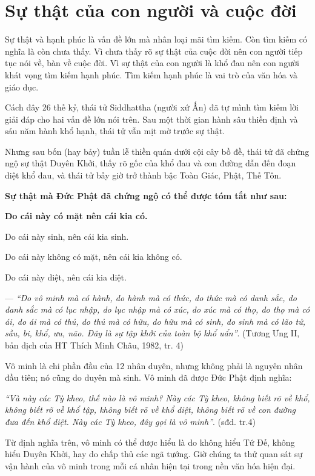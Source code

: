 \chapter{Sự thật của con người và cuộc đời} %
\label{cha:su_that_cua_con_nguoi_va_cuoc_doi}

Sự thật và hạnh phúc là vấn đề lớn mà nhân loại mãi tìm kiếm. Còn tìm kiếm có nghĩa là còn chưa thấy. Vì chưa thấy rõ sự thật của cuộc đời nên con người tiếp tục nói về, bàn về cuộc đời. Vì sự thật của con người là khổ đau nên con người khát vọng tìm kiếm hạnh phúc. Tìm kiếm hạnh phúc là vai trò của văn hóa và giáo dục.

Cách đây 26 thế kỷ, thái tử Siddhattha (người xứ Ấn) đã tự mình tìm kiếm lời giải đáp cho hai vấn đề lớn nói trên. Sau một thời gian hành sâu thiền định và sáu năm hành khổ hạnh, thái tử vẫn mịt mờ trước sự thật.

Nhưng sau bốn (hay bảy) tuần lễ thiền quán dưới cội cây bồ đề, thái tử đã chứng ngộ sự thật Duyên Khởi, thấy rõ gốc của khổ đau và con đường dẫn đến đoạn diệt khổ đau, và thái tử bấy giờ trở thành bậc Toàn Giác, Phật, Thế Tôn.

\hrulefill

{\bf Sự thật mà Đức Phật đã chứng ngộ có thể được tóm tắt như sau:}


{\bf Do cái này có mặt nên cái kia có.

Do cái này sinh, nên cái kia sinh.

Do cái này không có mặt, nên cái kia không có.

Do cái này diệt, nên cái kia diệt.}

— \emph{``Do vô minh mà có hành, do hành mà có thức, do thức mà có danh sắc, do danh sắc mà có lục nhập, do lục nhập mà có xúc, do xúc mà có thọ, do thọ mà có ái, do ái mà có thủ, do thủ mà có hữu, do hữu mà có sinh, do sinh mà có lão tử, sầu, bi, khổ, ưu, não. Đây là sự tập khởi của toàn bộ khổ uẩn''}. (Tương Ưng II, bản dịch của HT Thích Minh Châu, 1982, tr. 4)

\hrulefill

Vô minh là chi phần đầu của 12 nhân duyên, nhưng không phải là nguyên nhân đầu tiên; nó cũng do duyên mà sinh. Vô minh đã được Đức Phật định nghĩa:

\emph{``Và này các Tỳ kheo, thế nào là vô minh? Này các Tỳ kheo, không biết rõ về khổ, không biết rõ về khổ tập, không biết rõ về khổ diệt, không biết rõ về con đường đưa đến khổ diệt. Này các Tỳ kheo, đây gọi là vô minh''}. (sđd. tr.4)

Từ định nghĩa trên, vô minh có thể được hiểu là do không hiểu Tứ Đế, không hiểu Duyên Khởi, hay do chấp thủ các ngã tướng. Giờ chúng ta thử quan sát sự vận hành của vô minh trong mỗi cá nhân hiện tại trong nền văn hóa hiện đại.

